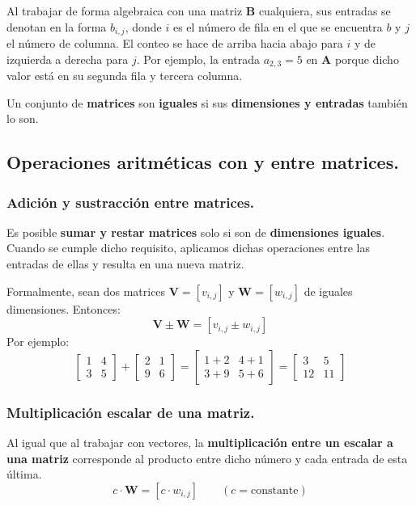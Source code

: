 \documentclass[12pt]{article}
\begin{document}
Al trabajar de forma algebraica con una matriz $\mathbf{B}$ cualquiera, sus entradas se denotan en la forma $b_{i, j}$, donde $i$ es el número de fila en el que se encuentra $b$ y $j$ el número de columna. El conteo se hace de arriba hacia abajo para $i$ y de izquierda a derecha para $j$. Por ejemplo, la entrada $a_{2, 3} = 5$ en $\mathbf{A}$ porque dicho valor está en su segunda fila y tercera columna.

Un conjunto de \textbf{matrices} son \textbf{iguales} si sus \textbf{dimensiones y entradas} también lo son.

\subsection{Operaciones aritméticas con y entre matrices.}

\subsubsection{Adición y sustracción entre matrices.}

Es posible \textbf{sumar y restar matrices} solo si son de \textbf{dimensiones iguales}. Cuando se cumple dicho requisito, aplicamos dichas operaciones entre las entradas de ellas y resulta en una nueva matriz.

Formalmente, sean dos matrices $\mathbf{V} = [v_{i, j}]$ y $\mathbf{W} = [w_{i, j}]$ de iguales dimensiones. Entonces:
\[
  \mathbf{V} \pm \mathbf{W} = [v_{i, j} \pm w_{i, j}]
\]
Por ejemplo:
\[
\begin{bmatrix}
1 & 4 \\
3 & 5
\end{bmatrix} +
\begin{bmatrix}
2 & 1 \\
9 & 6
\end{bmatrix} =
\begin{bmatrix}
1 + 2 & 4 + 1 \\
3 + 9 & 5 + 6
\end{bmatrix} =
\begin{bmatrix}
3 & 5 \\
12 & 11
\end{bmatrix}
\]

\subsubsection{Multiplicación escalar de una matriz.}

Al igual que al trabajar con vectores, la \textbf{multiplicación entre un escalar a una matriz} corresponde al producto entre dicho número y cada entrada de esta última.
\[
  c \cdot \mathbf{W} = [c \cdot w_{i, j}] \qquad (c = \text{constante})
\]
\end{document}
